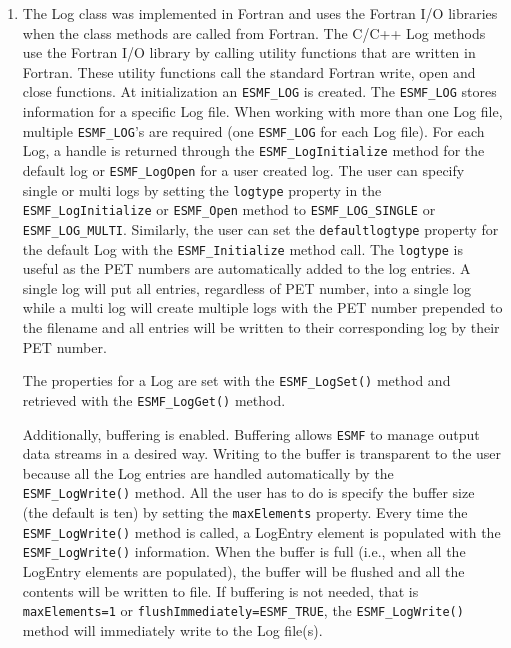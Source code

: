 %
\begin{enumerate}

\item The Log class was implemented in Fortran and uses the Fortran I/O 
libraries when the class methods are called from Fortran. The C/C++ Log
methods use the Fortran I/O library by calling utility functions that are
written in Fortran. These utility functions call the standard Fortran write, 
open and close functions.  At initialization an {\tt ESMF\_LOG} is created. 
The {\tt ESMF\_LOG} stores information for a specific Log file.   When working 
with more than one Log file, multiple {\tt ESMF\_LOG}'s are required (one 
{\tt ESMF\_LOG} for each Log file).  For each Log, a handle is returned 
through the {\tt ESMF\_LogInitialize} method for the default log or {\tt ESMF\_LogOpen} for a user created log.  The user can specify single or multi logs by 
setting the {\tt logtype} property in the {\tt ESMF\_LogInitialize} or 
{\tt ESMF\_Open} method to {\tt ESMF\_LOG\_SINGLE} or {\tt ESMF\_LOG\_MULTI}.
Similarly, the user can set the {\tt defaultlogtype} property for the default
Log with the {\tt ESMF\_Initialize} method call.
The {\tt logtype} is useful as the PET numbers are automatically added to the 
log entries.  A single log will put all entries, regardless of PET number, 
into a single log while a multi log will create multiple logs with the PET 
number prepended to the filename and all entries will be written to their 
corresponding log by their PET number.

The properties for a Log are set with the {\tt ESMF\_LogSet()} method and 
retrieved with the {\tt ESMF\_LogGet()} method.

Additionally, buffering is enabled.  Buffering allows {\tt ESMF} to manage 
output data streams in a desired way.  Writing to the buffer is transparent 
to the user because all the Log entries are handled automatically by the 
{\tt ESMF\_LogWrite()} method.  All the user has to do is specify the buffer
size (the default is ten) by setting the {\tt maxElements} property.  Every 
time the {\tt ESMF\_LogWrite()} method is called, a LogEntry element is 
populated with the {\tt ESMF\_LogWrite()} information.  When the buffer is 
full (i.e., when all the LogEntry elements are populated), the buffer will be 
flushed and all the contents will be written to file.  If buffering is not 
needed, that is {\tt maxElements=1} or {\tt flushImmediately=ESMF\_TRUE}, 
the {\tt ESMF\_LogWrite()} method will immediately write to the Log file(s).
\end{enumerate}
